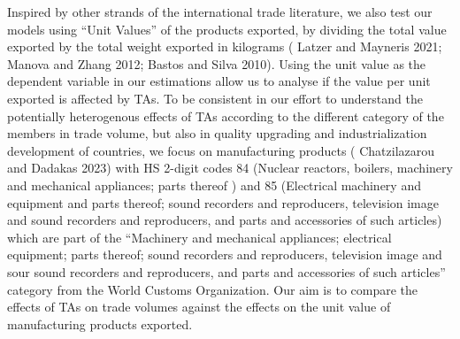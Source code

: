 Inspired by other strands of the international trade literature, we also
test our models using ``Unit Values'' of the products exported, by
dividing the total value exported by the total weight exported in
kilograms (\cite{latzer_average_2021} Latzer and Mayneris 2021; \cite{manova_export_2012} Manova and Zhang 2012; \cite{bastos_quality_2010} Bastos and
Silva 2010). Using the unit value as the dependent variable in our
estimations allow us to analyse if the value per unit exported is
affected by TAs. To be consistent in our effort to understand the
potentially heterogenous effects of TAs according to the different
category of the members in trade volume, but also in quality upgrading
and industrialization development of countries, we focus on
manufacturing products (\cite{chatzilazarou_trade_2023} Chatzilazarou and Dadakas 2023) with HS 2-digit
codes 84 (Nuclear reactors, boilers, machinery and mechanical
appliances; parts thereof ) and 85 (Electrical machinery and equipment
and parts thereof; sound recorders and reproducers, television image and
sound recorders and reproducers, and parts and accessories of such
articles) which are part of the ``Machinery and mechanical appliances;
electrical equipment; parts thereof; sound recorders and reproducers,
television image and sour sound recorders and reproducers, and parts and
accessories of such articles'' category from the World Customs
Organization. Our aim is to compare the effects of TAs on trade volumes
against the effects on the unit value of manufacturing products
exported.